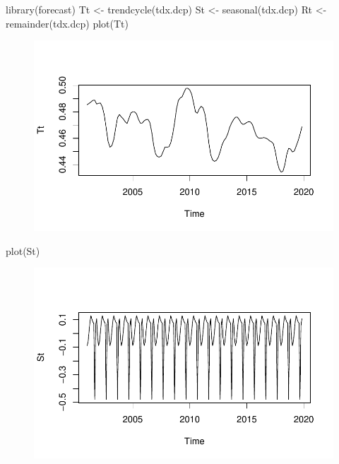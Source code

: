 \documentclass[
  letterpaper,
  DIV=11,
  numbers=noendperiod]{scrartcl}
\newenvironment{Shaded}{\begin{snugshade}}{\end{snugshade}}
\newcommand{\FunctionTok}[1]{\textcolor[rgb]{0.28,0.35,0.67}{#1}}
\newcommand{\NormalTok}[1]{\textcolor[rgb]{0.00,0.23,0.31}{#1}}
\newcommand{\OtherTok}[1]{\textcolor[rgb]{0.00,0.23,0.31}{#1}}
\begin{document}
\begin{Shaded}
\begin{Highlighting}[]
\FunctionTok{library}\NormalTok{(forecast)}
\NormalTok{Tt }\OtherTok{\textless{}{-}} \FunctionTok{trendcycle}\NormalTok{(tdx.dcp)}
\NormalTok{St }\OtherTok{\textless{}{-}} \FunctionTok{seasonal}\NormalTok{(tdx.dcp)}
\NormalTok{Rt }\OtherTok{\textless{}{-}} \FunctionTok{remainder}\NormalTok{(tdx.dcp)}
\FunctionTok{plot}\NormalTok{(Tt)}
\end{Highlighting}
\end{Shaded}

\begin{figure}[H]

{\centering \includegraphics{Quarto_files/figure-pdf/unnamed-chunk-15-1.pdf}

}

\end{figure}

\begin{Shaded}
\begin{Highlighting}[]
\FunctionTok{plot}\NormalTok{(St)}
\end{Highlighting}
\end{Shaded}

\begin{figure}[H]

{\centering \includegraphics{Quarto_files/figure-pdf/unnamed-chunk-15-2.pdf}

}

\end{figure}
\end{document}
